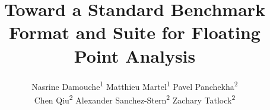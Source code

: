 \documentclass{llncs}
\begin{document}
\title{Toward a Standard Benchmark Format and Suite for Floating Point Analysis}
\author{
  Nasrine Damouche\textsuperscript{1} \hspace{0.1in}
  Matthieu Martel\textsuperscript{1} \hspace{0.1in}
  Pavel Panchekha\textsuperscript{2} \\
  Chen Qiu\textsuperscript{2} \hspace{0.1in}
  Alexander Sanchez-Stern\textsuperscript{2} \hspace{0.1in}
  Zachary Tatlock\textsuperscript{2}
}
\maketitle












\end{document}
